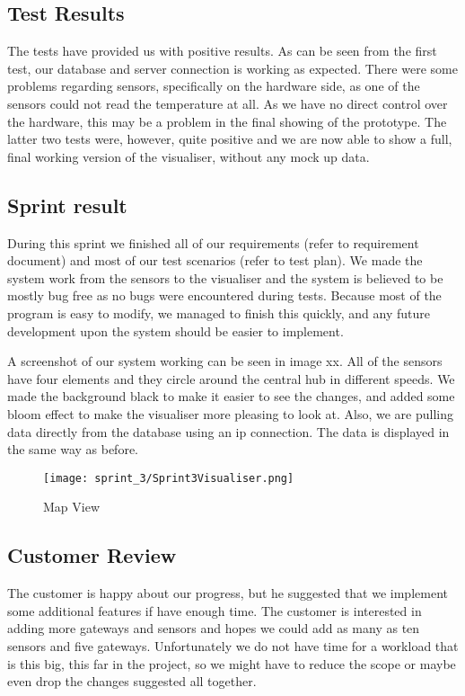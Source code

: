 \documentclass[../document]{subfiles}
\begin{document}
\subsection{Test Results}
The tests have provided us with positive results. As can be seen from the first test, our database and server connection is working as expected. There were some problems regarding sensors, specifically on the hardware side, as one of the sensors could not read the temperature at all. As we have no direct control over the hardware, this may be a problem in the final showing of the prototype. The latter two tests were, however, quite positive and we are now able to show a full, final working version of the visualiser, without any mock up data.

\subsection{Sprint result}
During this sprint we finished all of our requirements (refer to requirement document) and most of our test scenarios (refer to test plan). We made the system work from the sensors to the visualiser and the system is believed to be mostly bug free as no bugs were encountered during tests. Because most of the program is easy to modify, we managed to finish this quickly, and any future development upon the system should be easier to implement.

A screenshot of our system working can be seen in image xx. All of the sensors have four elements and they circle around the central hub in different speeds. We made the background black to make it easier to see the changes, and added some bloom effect to make the visualiser more pleasing to look at. Also, we are pulling data directly from the database using an ip connection. The data is displayed in the same way as before. 

\begin{figure}[H]
	\centering
	\texttt{[image: sprint\_3/Sprint3Visualiser.png]}
	\caption{Map View}
\end{figure}

\subsection{Customer Review}
The customer is happy about our progress, but he suggested that we implement some additional features if have enough time. The customer is interested in adding more gateways and sensors and hopes we could add as many as ten sensors and five gateways. Unfortunately we do not have time for a workload that is this big, this far in the project, so we might have to reduce the scope or maybe even drop the changes suggested all together.
\end{document}
